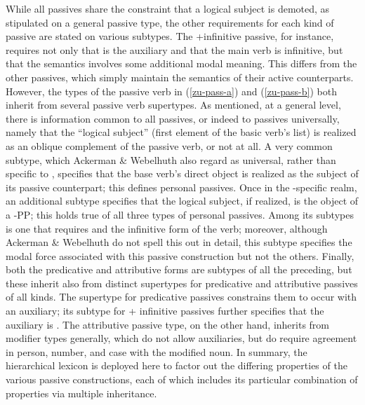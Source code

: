 \documentclass[output=paper,biblatex,babelshorthands,newtxmath,draftmode,colorlinks,citecolor=brown]{langscibook}
\begin{document}
While all passives share the constraint that a logical subject is demoted, as stipulated on a general  passive type, the other requirements for each kind of passive are stated on various subtypes.
The +infinitive passive, for instance, requires not only that  is the auxiliary and that the main verb is infinitive, but that the semantics involves some additional modal meaning.
This differs from the other passives, which simply maintain the semantics of their active counterparts.
However, the types of the passive verb  in (\ref{zu-pass-a}) and (\ref{zu-pass-b}) both inherit from several passive verb supertypes.
As mentioned, at a general level, there is information common to all  passives, or indeed to passives universally, namely that the ``logical subject'' (first element of the basic verb's  list) is realized as an oblique complement of the passive verb, or not at all.
A very common subtype, which Ackerman \& Webelhuth also regard as universal, rather than specific to , specifies that the base verb's direct object is realized as the subject of its passive counterpart; this defines personal passives.
Once in the -specific realm, an additional subtype specifies that the logical subject, if realized, is the object of a -PP; this holds true of all three types of  personal passives.
Among its subtypes is one that requires  and the infinitive form of the verb; moreover, although Ackerman \& Webelhuth do not spell this out in detail, this subtype specifies the modal force associated with this passive construction but not the others.
Finally, both the predicative and attributive forms are subtypes of all the preceding, but these inherit also from distinct supertypes for predicative and attributive passives of all kinds.
The supertype for predicative passives constrains them to occur with an auxiliary; its subtype for  + infinitive passives further specifies that the auxiliary is .
The attributive passive type, on the other hand, inherits from modifier types generally, which do not allow auxiliaries, but do require agreement in person, number, and case with the modified noun.
In summary, the hierarchical lexicon is deployed here to factor out the differing properties of the
various  passive constructions, each of which includes its particular combination of
properties via multiple inheritance.%
%
\end{document}
